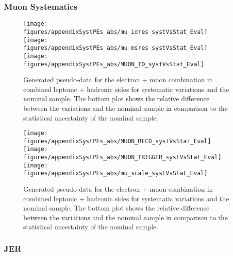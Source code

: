 \clearpage
\subsubsection{Muon Systematics}

\begin{figure}[!hb]
\begin{center}
        
        \texttt{[image: figures/appendixSystPEs\_abs/mu\_idres\_systVsStat\_Eval]}\\
        \texttt{[image: figures/appendixSystPEs\_abs/mu\_msres\_systVsStat\_Eval]}\\
        \texttt{[image: figures/appendixSystPEs\_abs/MUON\_ID\_systVsStat\_Eval]}
        
\caption{Generated pseudo-data for the electron + muon combination in combined leptonic + hadronic sides for systematic variations and the nominal \ttbar sample. The bottom plot shows the relative difference between the variations and the nominal sample in comparison to the statistical uncertainty of the nominal sample.}   
\label{fig:systematicVar_lephad_MUON}
\end{center}
\end{figure}


\begin{figure}[!hb]
\begin{center}
        
        \texttt{[image: figures/appendixSystPEs\_abs/MUON\_RECO\_systVsStat\_Eval]}\\
        \texttt{[image: figures/appendixSystPEs\_abs/MUON\_TRIGGER\_systVsStat\_Eval]}\\
        \texttt{[image: figures/appendixSystPEs\_abs/mu\_scale\_systVsStat\_Eval]}
        
\caption{Generated pseudo-data for the electron + muon combination in combined leptonic + hadronic sides for systematic variations and the nominal \ttbar sample. The bottom plot shows the relative difference between the variations and the nominal sample in comparison to the statistical uncertainty of the nominal sample.}   
\label{fig:systematicVar_lephad_MUON}
\end{center}
\end{figure}



\clearpage
\subsubsection{JER}

